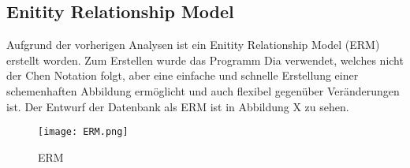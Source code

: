 \subsection{Enitity Relationship Model}
\label{subsec:erm-diagram}

Aufgrund der vorherigen Analysen ist ein Enitity Relationship Model (ERM) erstellt
worden. Zum Erstellen wurde das Programm Dia verwendet, welches nicht der Chen
Notation folgt, aber eine einfache und schnelle Erstellung einer schemenhaften Abbildung ermöglicht und auch flexibel gegenüber Veränderungen ist.
Der Entwurf der Datenbank als ERM ist in Abbildung X zu sehen.

\begin{figure}[H]
\centering
\texttt{[image: ERM.png]}
\caption{ERM}
\label{fig:erm}
\end{figure}

